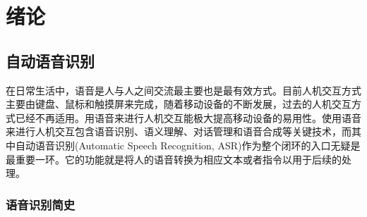 
\chapter{绪论}
\label{chap:intro0}

\section{自动语音识别}
\label{chap:intro0-asr}


在日常生活中，语音是人与人之间交流最主要也是最有效方式。目前人机交互方式主要由键盘、鼠标和触摸屏来完成，随着移动设备的不断发展，过去的人机交互方式已经不再适用。用语音来进行人机交互能极大提高移动设备的易用性。使用语音来进行人机交互包含语音识别、语义理解、对话管理和语音合成等关键技术，而其中自动语音识别(Automatic Speech Recognition, ASR)作为整个闭环的入口无疑是最重要一环。它的功能就是将人的语音转换为相应文本或者指令以用于后续的处理。

\subsection{语音识别简史}
\label{chap:intro0-asr-history}


